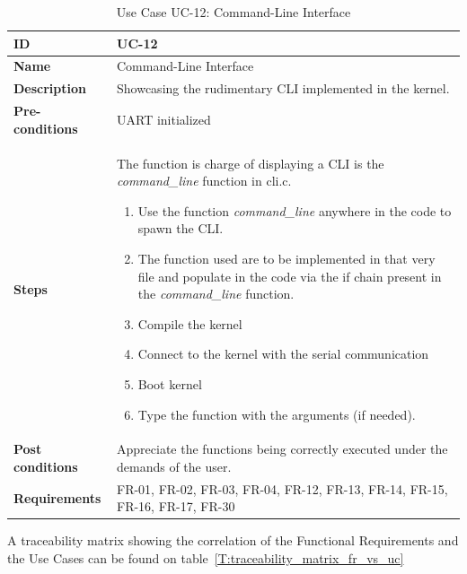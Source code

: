 \begin{table}[H]
    \centering
    \begin{tabular}{| p{3cm} | p{7cm} |}
    \hline
    \textbf{ID}             & UC-12 \\ \hline
    \textbf{Name}           & Command-Line Interface\\ \hline
    \textbf{Description}    & Showcasing the rudimentary CLI implemented in the kernel.
	\\ \hline
    \textbf{Pre-conditions} & UART initialized \\ \hline
    \textbf{Steps}          &  The function is charge of displaying a CLI is the \textit{command\_line} function in cli.c.
    							 \begin{enumerate}
    							 	\item Use the function \textit{command\_line} anywhere in the code to spawn the CLI.
    							 	\item The function used are to be implemented in that very file and populate in the code via the if chain present in the \textit{command\_line} function.
    							 	\item Compile the kernel
                                	\item Connect to the kernel with the serial communication
    							 	\item Boot kernel
                                	\item Type the function with the arguments (if needed).
                                \end{enumerate}
 \\ \hline
    \textbf{Post conditions} & 	Appreciate the functions being correctly executed under the demands of the user.
    							   	\\ \hline
    \textbf{Requirements}       & FR-01, FR-02, FR-03, FR-04, FR-12, FR-13, FR-14, FR-15, FR-16, FR-17, FR-30\\ \hline
    \end{tabular}
    \caption{Use Case UC-12: Command-Line Interface}
\end{table}


A traceability matrix showing the correlation of the Functional Requirements and the Use Cases can be found on table~\ref{T:traceability_matrix_fr_vs_uc}





